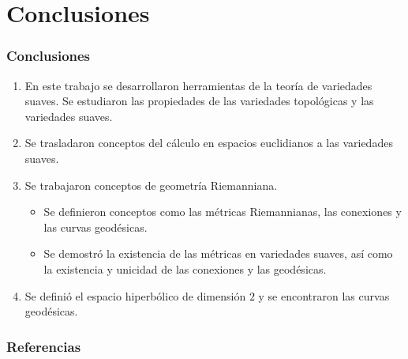\section{Conclusiones}
\begin{frame}
	\frametitle{Conclusiones}
	\begin{enumerate}
		\item En este trabajo se desarrollaron herramientas de la teoría de variedades suaves. Se estudiaron las propiedades de las variedades topológicas y las variedades suaves. \pause
		\item Se trasladaron conceptos del cálculo en espacios euclidianos a las variedades suaves. \pause
		\item Se trabajaron conceptos de geometría Riemanniana. \pause
			\begin{itemize}
				\item Se definieron conceptos como las métricas Riemannianas, las conexiones y las curvas geodésicas. \pause
				\item Se demostró la existencia de las métricas en variedades suaves, así como la existencia y unicidad de las conexiones y las geodésicas. \pause
			\end{itemize}
		\item Se definió el espacio hiperbólico de dimensión $2$ y se encontraron las curvas geodésicas.
	\end{enumerate}
\end{frame}



\begin{frame}[allowframebreaks]
\frametitle{Referencias}

\printbibliography
\end{frame}
